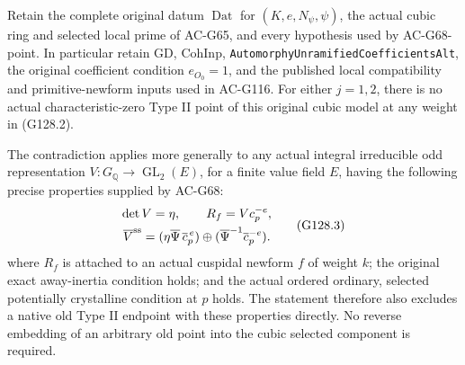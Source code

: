\begin{theorem}
\label{AC-G128-quartic-exclusion}
Retain the complete original datum \(\operatorname{Dat}\) for
\((K,e,N_\psi,\psi)\), the actual cubic ring and selected local
prime of AC-G65, and every hypothesis used by AC-G68-point.
In particular retain \(\mathrm{GD}\), \(\mathrm{CohInp}\),
\texttt{AutomorphyUnramifiedCoefficientsAlt}, the original
coefficient condition \(e_{O_0}=1\), and the published local
compatibility and primitive-newform inputs used in AC-G116.
For either \(j=1,2\), there is no actual characteristic-zero Type II
point of this original cubic model at any weight in (G128.2).

The contradiction applies more generally to any actual integral
irreducible odd representation \(V:G_{\mathbb Q}\to
\operatorname{GL}_2(E)\), for a finite value field \(E\), having
the following precise properties supplied by AC-G68:
\[
 \begin{gathered}
 \det V=\eta,\qquad R_f=Vc_p^{-e},\\
 \overline V^{\rm ss}
   =(\eta\overline\Psi\,\overline c_p^{\,e})
       \oplus(\overline\Psi^{-1}\overline c_p^{-e}).
 \end{gathered}
 \tag{G128.3}
\]
where \(R_f\) is attached to an actual cuspidal newform \(f\) of weight \(k\);
the original exact away-inertia condition holds; and the actual
ordered ordinary, selected potentially crystalline condition at
\(p\) holds.  The statement therefore also excludes a native old
Type II endpoint with these properties directly.  No reverse
embedding of an arbitrary old point into the cubic selected
component is required.
\end{theorem}

